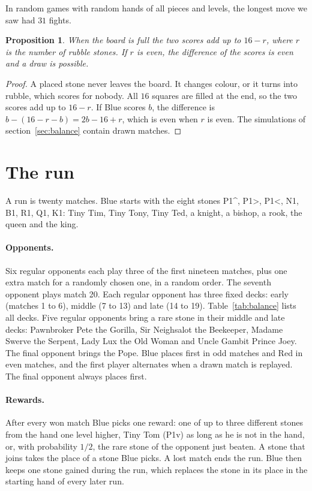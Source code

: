 \documentclass[11pt,a4paper]{article}
\newtheorem{proposition}{Proposition}
\begin{document}
In random games with random hands of all pieces and levels, the longest move we saw had $31$ fights.

\begin{proposition}\label{prop:draw}
When the board is full the two scores add up to $16-r$, where $r$ is the number of rubble stones. If $r$ is even, the difference of the scores is even and a draw is possible.
\end{proposition}
\begin{proof}
A placed stone never leaves the board. It changes colour, or it turns into rubble, which scores for nobody. All $16$ squares are filled at the end, so the two scores add up to $16-r$. If Blue scores $b$, the difference is $b-(16-r-b)=2b-16+r$, which is even when $r$ is even. The simulations of section~\ref{sec:balance} contain drawn matches.
\end{proof}

\section{The run}\label{sec:run}

A run is twenty matches. Blue starts with the eight stones P1\^{}, P1>, P1<, N1, B1, R1, Q1, K1: Tiny Tim, Tiny Tony, Tiny Ted, a knight, a bishop, a rook, the queen and the king.

\paragraph{Opponents.} Six regular opponents each play three of the first nineteen matches, plus one extra match for a randomly chosen one, in a random order. The seventh opponent plays match 20. Each regular opponent has three fixed decks: early (matches 1 to 6), middle (7 to 13) and late (14 to 19). Table~\ref{tab:balance} lists all decks. Five regular opponents bring a rare stone in their middle and late decks: Pawnbroker Pete the Gorilla, Sir Neighsalot the Beekeeper, Madame Swerve the Serpent, Lady Lux the Old Woman and Uncle Gambit Prince Joey. The final opponent brings the Pope. Blue places first in odd matches and Red in even matches, and the first player alternates when a drawn match is replayed. The final opponent always places first.

\paragraph{Rewards.} After every won match Blue picks one reward: one of up to three different stones from the hand one level higher, Tiny Tom (P1v) as long as he is not in the hand, or, with probability $1/2$, the rare stone of the opponent just beaten. A stone that joins takes the place of a stone Blue picks. A lost match ends the run. Blue then keeps one stone gained during the run, which replaces the stone in its place in the starting hand of every later run.
\end{document}

